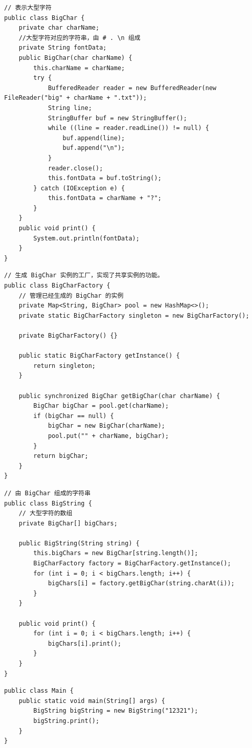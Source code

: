 \begin{lstlisting}
// 表示大型字符
public class BigChar {
	private char charName;
	//大型字符对应的字符串，由 # . \n 组成
	private String fontData;
	public BigChar(char charName) {
		this.charName = charName;
		try {
			BufferedReader reader = new BufferedReader(new FileReader("big" + charName + ".txt"));
			String line;
			StringBuffer buf = new StringBuffer();
			while ((line = reader.readLine()) != null) {
				buf.append(line);
				buf.append("\n");
			}
			reader.close();
			this.fontData = buf.toString();
		} catch (IOException e) {
			this.fontData = charName + "?";
		}
	}
	public void print() {
		System.out.println(fontData);
	}
}
\end{lstlisting}
\begin{lstlisting}
// 生成 BigChar 实例的工厂，实现了共享实例的功能。
public class BigCharFactory {
	// 管理已经生成的 BigChar 的实例
	private Map<String, BigChar> pool = new HashMap<>();
	private static BigCharFactory singleton = new BigCharFactory();
	
	private BigCharFactory() {}
	
	public static BigCharFactory getInstance() {
		return singleton;
	}
	
	public synchronized BigChar getBigChar(char charName) {
		BigChar bigChar = pool.get(charName);
		if (bigChar == null) {
			bigChar = new BigChar(charName);
			pool.put("" + charName, bigChar);
		}
		return bigChar;
	}
}
\end{lstlisting}
\begin{lstlisting}
// 由 BigChar 组成的字符串
public class BigString {
	// 大型字符的数组
	private BigChar[] bigChars;
	
	public BigString(String string) {
		this.bigChars = new BigChar[string.length()];
		BigCharFactory factory = BigCharFactory.getInstance();
		for (int i = 0; i < bigChars.length; i++) {
			bigChars[i] = factory.getBigChar(string.charAt(i));
		}
	}
	
	public void print() {
		for (int i = 0; i < bigChars.length; i++) {
			bigChars[i].print();
		}
	}
}
\end{lstlisting}
\begin{lstlisting}
public class Main {
	public static void main(String[] args) {
		BigString bigString = new BigString("12321");
		bigString.print();
	}
}
\end{lstlisting}

